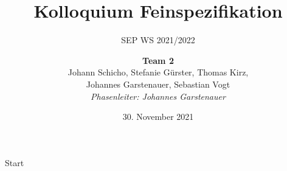 \documentclass{beamer}
\title{Kolloquium Feinspezifikation}
\subtitle{SEP WS 2021/2022}
\date{\small 30. November 2021}
\author{\textbf{Team 2} \\ \small {Johann Schicho, Stefanie Gürster, Thomas Kirz,\\ Johannes Garstenauer, Sebastian Vogt} \\ \vspace{0.5cm}\emph{Phasenleiter: Johannes Garstenauer}\normalsize}
\begin{document}
    \begin{frame}{Start}
        \titlepage
    \end{frame}

\end{document}
